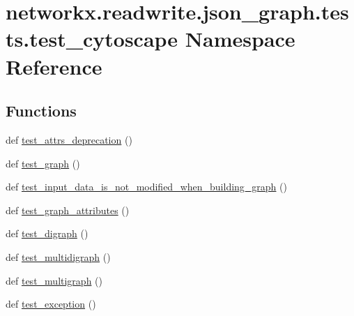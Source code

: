 \hypertarget{namespacenetworkx_1_1readwrite_1_1json__graph_1_1tests_1_1test__cytoscape}{}\section{networkx.\+readwrite.\+json\+\_\+graph.\+tests.\+test\+\_\+cytoscape Namespace Reference}
\label{namespacenetworkx_1_1readwrite_1_1json__graph_1_1tests_1_1test__cytoscape}
\subsection*{Functions}
\begin{DoxyCompactItemize}
\item 
def \hyperlink{namespacenetworkx_1_1readwrite_1_1json__graph_1_1tests_1_1test__cytoscape_a2357f390e0d8b3c43bb77054193c77b9}{test\+\_\+attrs\+\_\+deprecation} ()
\item 
def \hyperlink{namespacenetworkx_1_1readwrite_1_1json__graph_1_1tests_1_1test__cytoscape_afc806b0191335f4a0e104e934a68e3ca}{test\+\_\+graph} ()
\item 
def \hyperlink{namespacenetworkx_1_1readwrite_1_1json__graph_1_1tests_1_1test__cytoscape_a1168b050ea9590c007584d3fe24772d5}{test\+\_\+input\+\_\+data\+\_\+is\+\_\+not\+\_\+modified\+\_\+when\+\_\+building\+\_\+graph} ()
\item 
def \hyperlink{namespacenetworkx_1_1readwrite_1_1json__graph_1_1tests_1_1test__cytoscape_a061d0882a4c82c6e2b6d1722a0a7f3ad}{test\+\_\+graph\+\_\+attributes} ()
\item 
def \hyperlink{namespacenetworkx_1_1readwrite_1_1json__graph_1_1tests_1_1test__cytoscape_a52fe4a6775180ce7529c7fbd6128cbd7}{test\+\_\+digraph} ()
\item 
def \hyperlink{namespacenetworkx_1_1readwrite_1_1json__graph_1_1tests_1_1test__cytoscape_a34851cf849f86ac3371bee7ca8c9a937}{test\+\_\+multidigraph} ()
\item 
def \hyperlink{namespacenetworkx_1_1readwrite_1_1json__graph_1_1tests_1_1test__cytoscape_a6713f9aabc771e8c59c0a99361c9cc87}{test\+\_\+multigraph} ()
\item 
def \hyperlink{namespacenetworkx_1_1readwrite_1_1json__graph_1_1tests_1_1test__cytoscape_ae7b89ee022cce6b7919e0779d9531af9}{test\+\_\+exception} ()
\end{DoxyCompactItemize}


